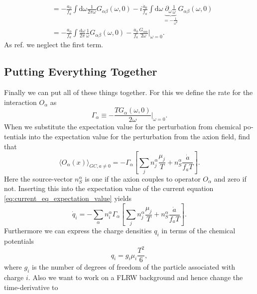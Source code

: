 \documentclass[master,       %
               twoside,        %
               BCOR10mm,       %
               english,ngerman, %
               ]{GAUBM}
\begin{document}
\begin{otherlanguage}{english}
\begin{align}
	 \nonumber \\
	 &= - \frac{a_0}{f_a} \int \mathrm{d} \omega \frac{1}{2 \pi \omega} G_{\alpha \beta}(\omega, 0) - i \frac{\dot{a}_0}{f_a} \int \mathrm{d} \omega \underbrace{\partial_\omega \frac{1}{\omega}}_{= - \frac{1}{\omega^2}} G_{\alpha \beta}(\omega, 0) \nonumber \\
	 &= - \frac{a_0}{f_a} \int \frac{\mathrm{d} \omega}{2 \pi} \frac{1}{\omega} G_{\alpha \beta}(\omega, 0) - \frac{\dot{a}_0}{f_a} \frac{G_{\alpha \alpha}}{2 \omega} \Big|_{\omega = 0}.
	 \label{eq:axion_source_term_linear_response}
\end{align}
As ref. \cite{Domcke:2020kcp_Generic_Couplings} we neglect the first term.

\subsection{Putting Everything Together}
Finally we can put all of these things together.
For this we define the rate for the interaction $O_\alpha$ as
\begin{equation}
	\Gamma_\alpha \equiv - \frac{T G_\alpha(\omega, 0)}{2\omega} \Big|_{\omega = 0}.
\end{equation}
When we substitute the expectation value for the perturbation from chemical potentials into the expectation value for the perturbation from the axion field, find that
\begin{equation}
	\langle O_\alpha(x) \rangle_{GC, a \ne 0} = - \Gamma_\alpha \left[ \sum_j n_j^\alpha \frac{\mu_j}{T} + n_S^\alpha \frac{\dot{a}}{f_a T} \right].
\end{equation}
Here the source-vector $n_S^\alpha$ is one if the axion couples to operator $O_\alpha$ and zero if not.
Inserting this into the expectation value of the current equation \eqref{eq:current_eq_expectation_value} yields
\begin{equation}
	\label{eq:transport_eq_1}
	\dot{q}_i = - \sum_\alpha n^\alpha_i \Gamma_\alpha \left[ \sum_j n_j^\alpha \frac{\mu_j}{T} + n_S^\alpha \frac{\dot{a}}{f_a T} \right].
\end{equation}
Furthermore we can express the charge densities $q_i$ in terms of the chemical potentials
\begin{equation}
	q_i = g_i \mu_i \frac{T^2}{6},
\end{equation}
where $g_i$ is the number of degrees of freedom of the particle associated with charge $i$.
Also we want to work on a FLRW background and hence change the time-derivative to
\begin{equation}

\end{equation}
\end{otherlanguage}
\end{document}
